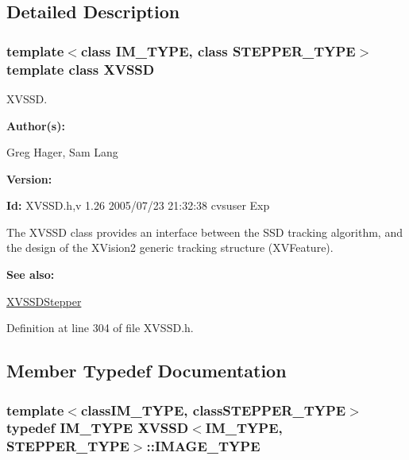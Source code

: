 \subsection{Detailed Description}
\subsubsection*{template$<$class IM\_\-TYPE, class STEPPER\_\-TYPE$>$  template class XVSSD}

XVSSD.

\begin{Desc}
\item[{\bf Author(s): }]\par
 Greg Hager, Sam Lang \end{Desc}
\begin{Desc}
\item[{\bf Version: }]\par
 \end{Desc}
\begin{Desc}
\item[{\bf Id: }] XVSSD.h,v 1.26 2005/07/23 21:32:38 cvsuser Exp \end{Desc}


The XVSSD class provides an interface between the SSD tracking algorithm, and the design of the XVision2 generic tracking structure (XVFeature).

\begin{Desc}
\item[{\bf See also: }]\par
 \hyperlink{class_XVSSDStepper}{XVSSDStepper} \end{Desc}




Definition at line 304 of file XVSSD.h.

\subsection{Member Typedef Documentation}
\label{XVSSD_s0}
\hypertarget{class_XVSSD_s0}{
\subsubsection[IMAGE_TYPE]{\setlength{\rightskip}{0pt plus 5cm}template$<$classIM\_\-TYPE, classSTEPPER\_\-TYPE$>$ typedef IM\_\-TYPE XVSSD$<$IM\_\-TYPE, STEPPER\_\-TYPE$>$::IMAGE\_\-TYPE}}




